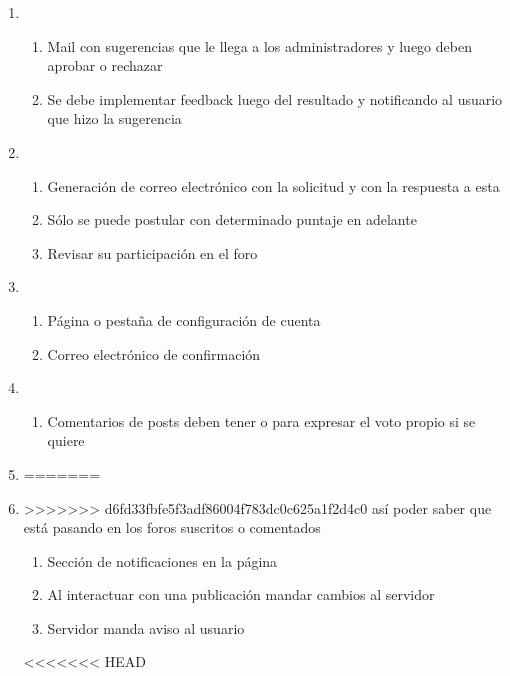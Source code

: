 \documentclass[12pt, letterpaper, notitlepage]{article}
\begin{document}
\begin{enumerate}
	\item {}
		\begin{enumerate}
			\item Mail con sugerencias que le llega a los administradores y luego deben aprobar o rechazar
			\item Se debe implementar feedback luego del resultado y notificando al usuario que hizo la sugerencia
		\end{enumerate}	
		
		
	\item {}
		\begin{enumerate}
			\item Generación de correo electrónico con la solicitud y con la respuesta a esta
			\item Sólo se puede postular con determinado puntaje en adelante
			\item Revisar su participación en el foro
		\end{enumerate}
		
	\item {}
    	\begin{enumerate}
			\item Página o pestaña de configuración de cuenta
			\item Correo electrónico de confirmación
		\end{enumerate}

   
   \item {}
       	\begin{enumerate}
			\item Comentarios de posts deben tener  o  para expresar el voto propio si se quiere
		\end{enumerate}

		
	\item {}		
=======
		\item {}		
>>>>>>> d6fd33fbfe5f3adf86004f783dc0c625a1f2d4c0
		{así poder saber que está pasando en los foros suscritos o comentados}
		\begin{enumerate}
			\item Sección de notificaciones en la página
			\item Al interactuar con una publicación mandar cambios al servidor
			\item Servidor manda aviso al usuario
		\end{enumerate}
<<<<<<< HEAD


\end{enumerate}
\end{document}
